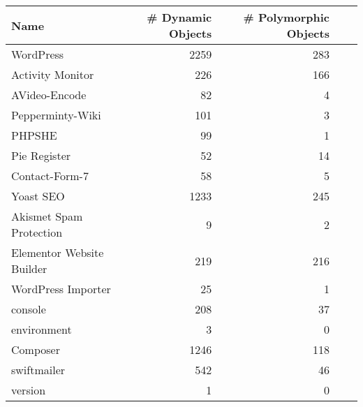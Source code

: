 \begin{table}[h]
	\centering
	\caption{}
	\label{table:oopprograms}
\begin{tabular}{l r r r r} 
    \toprule
    {\bf Name} &
    {\bf \# Dynamic Objects} &
    {\bf \# Polymorphic Objects}
	\\
	\midrule
	WordPress&
	2259  & 283
     
    \\

    Activity Monitor &
    226 & 166 
    
    \\

	AVideo-Encode &
	82 & 4

    \\
		
    Pepperminty-Wiki &
	101 & 3
    \\
	
	    
	PHPSHE &
	99 & 1

    \\
	
	
	Pie Register &
	52 & 14

    \\
    
    Contact-Form-7 &
    58 &  5
    \\

    Yoast SEO &
    1233 & 245
    \\

    Akismet Spam Protection &
    9 &  2
    \\

    Elementor Website Builder &
    219 & 216
    \\

    WordPress Importer &
    25 & 1
    \\

    console &
    208 & 37
    \\

    environment &
    3 & 0 
    \\

    Composer & 
    1246 & 118
    \\

    swiftmailer &
    542 & 46
    \\

    version &
    1 & 0
    \\


	\bottomrule 
\end{tabular}
\end{table}